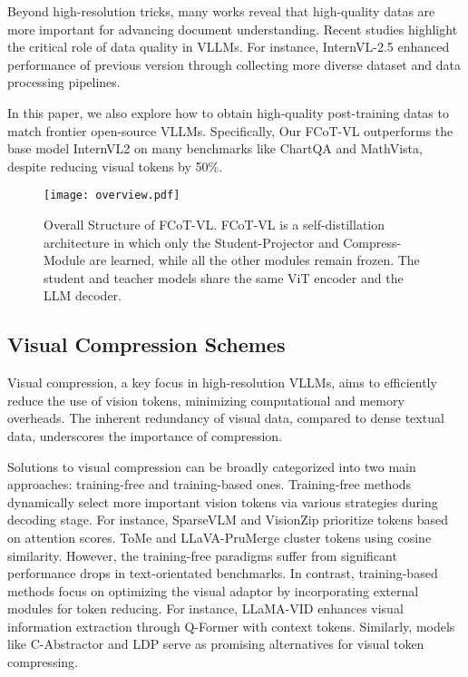 Beyond high-resolution tricks, many works reveal that high-quality datas are more important for advancing document understanding. Recent studies\cite{hu2024minicpm,li2024baichuan,li2025eagle} highlight the critical role of data quality in VLLMs. For instance, InternVL-2.5\cite{chen2024expanding} enhanced performance of previous version through collecting more diverse dataset and data processing pipelines.

In this paper, we also explore how to obtain high-quality post-training datas to match frontier open-source VLLMs. Specifically, Our FCoT-VL outperforms the base model InternVL2
on many benchmarks like ChartQA\cite{masry2022chartqa} and MathVista\cite{lu2024mathvista}, despite reducing visual tokens by 50$\%$.



\begin{figure*}[t]
  \centering
  \texttt{[image: overview.pdf]}
  \caption{Overall Structure of FCoT-VL. FCoT-VL is a self-distillation architecture in which only the Student-Projector and Compress-Module are learned, while all the other modules remain frozen. The student and teacher models share the same ViT encoder and the LLM decoder.}
  \label{fig:Overvieww}
\end{figure*}
\subsection{Visual Compression Schemes}
Visual compression, a key focus in high-resolution VLLMs, aims to efficiently reduce the use of vision tokens, minimizing computational and memory overheads. The inherent redundancy of visual data, compared to dense textual data, underscores the importance of compression.

Solutions to visual compression can be broadly categorized into two main approaches: training-free and training-based ones. Training-free methods dynamically select more important vision tokens via various strategies during decoding stage. For instance, SparseVLM\cite{zhang2024sparsevlm} and VisionZip \cite{yang2024visionzip} prioritize tokens based on attention scores. ToMe\cite{bolya2022token} and LLaVA-PruMerge\cite{shang2024llava} cluster tokens using cosine similarity. However, the training-free paradigms suffer from significant performance drops in text-orientated benchmarks. 
In contrast, training-based methods focus on optimizing the visual adaptor by incorporating external modules for token reducing. For instance, LLaMA-VID\cite{li2024llama} enhances visual information extraction through Q-Former\cite{li2023blip} with context tokens. Similarly, models like C-Abstractor\cite{cha2024honeybee} and LDP\cite{chu2024mobilevlm} serve as promising alternatives for visual token compressing.


